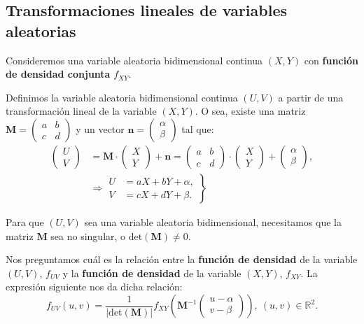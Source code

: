 \documentclass[]{book}
\begin{document}
\hypertarget{transformaciones-lineales-de-variables-aleatorias}{%
\subsection{Transformaciones lineales de variables aleatorias}\label{transformaciones-lineales-de-variables-aleatorias}}

Consideremos una variable aleatoria bidimensional continua \((X,Y)\) con \textbf{función de densidad conjunta} \(f_{XY}\).

Definimos la variable aleatoria bidimensional continua \((U,V)\) a partir de una transformación lineal de la variable \((X,Y)\). O sea, existe una matriz \(\mathbf{M}=\begin{pmatrix}a & b\\ c& d\end{pmatrix}\) y un vector \(\mathbf{n}=\begin{pmatrix}\alpha\\\beta \end{pmatrix}\) tal que:
\[
\begin{array}{rl}
\begin{pmatrix}U\\ V\end{pmatrix} & =\mathbf{M}\cdot \begin{pmatrix}X\\ Y\end{pmatrix}+\mathbf{n}=\begin{pmatrix}a & b\\ c& d\end{pmatrix}\cdot\begin{pmatrix}X\\ Y\end{pmatrix}+\begin{pmatrix}\alpha\\\beta \end{pmatrix},\\  & \Rightarrow \left.\begin{array}{rl}U & = aX+bY+\alpha,\\ V & =cX+dY+\beta.\end{array}\right\}
\end{array}
\]

Para que \((U,V)\) sea una variable aleatoria bidimensional, necesitamos que la matriz \(\mathbf{M}\) sea no singular, o \(\mathrm{det}(\mathbf{M})\neq 0\).

Nos preguntamos cuál es la relación entre la \textbf{función de densidad} de la variable \((U,V)\), \(f_{UV}\) y la \textbf{función de densidad} de la variable \((X,Y)\), \(f_{XY}\). La expresión siguiente nos da dicha relación:
\[
f_{UV}(u,v)=\frac{1}{|\mathrm{det}(\mathbf{M})|}f_{XY}\left(\mathbf{M}^{-1}\begin{pmatrix}u-\alpha\\ v-\beta\end{pmatrix}\right), \ (u,v)\in\mathbb{R}^2.
\]
\end{document}
